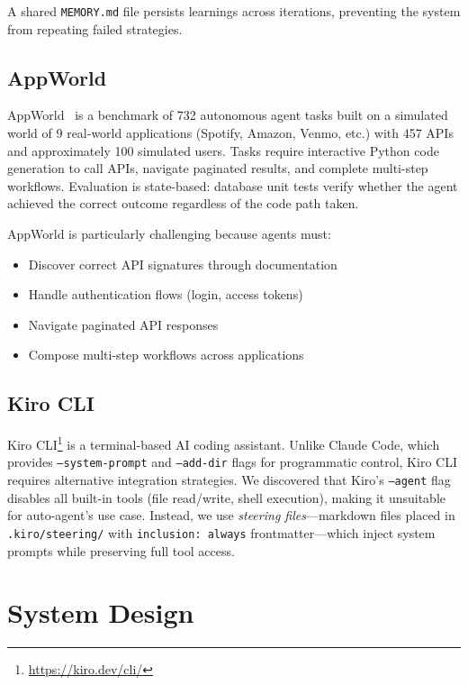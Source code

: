 \documentclass[11pt,a4paper]{article}
\begin{document}
A shared \texttt{MEMORY.md} file persists learnings across iterations, preventing the system from repeating failed strategies.

\subsection{AppWorld}

AppWorld~\cite{appworld} is a benchmark of 732 autonomous agent tasks built on a simulated world of 9 real-world applications (Spotify, Amazon, Venmo, etc.) with 457 APIs and approximately 100 simulated users. Tasks require interactive Python code generation to call APIs, navigate paginated results, and complete multi-step workflows. Evaluation is state-based: database unit tests verify whether the agent achieved the correct outcome regardless of the code path taken.

AppWorld is particularly challenging because agents must:
\begin{itemize}
    \item Discover correct API signatures through documentation
    \item Handle authentication flows (login, access tokens)
    \item Navigate paginated API responses
    \item Compose multi-step workflows across applications
\end{itemize}

\subsection{Kiro CLI}

Kiro CLI\footnote{\url{https://kiro.dev/cli/}} is a terminal-based AI coding assistant. Unlike Claude Code, which provides \texttt{--system-prompt} and \texttt{--add-dir} flags for programmatic control, Kiro CLI requires alternative integration strategies. We discovered that Kiro's \texttt{--agent} flag disables all built-in tools (file read/write, shell execution), making it unsuitable for auto-agent's use case. Instead, we use \emph{steering files}---markdown files placed in \texttt{.kiro/steering/} with \texttt{inclusion: always} frontmatter---which inject system prompts while preserving full tool access.

\section{System Design}
\end{document}

